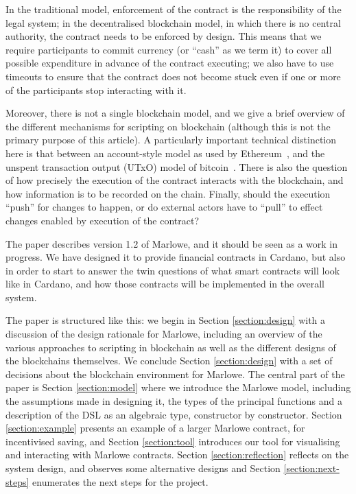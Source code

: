 \documentclass[
      acmsmall
    , screen
    , review=true
  ]{acmart}
\begin{document}
In the traditional model, enforcement of the contract is the responsibility of the legal system; in the decentralised blockchain model, in which there is no central authority, the contract needs to be enforced by design. This means that we require participants to commit currency (or ``cash'' as we term it) to cover all possible expenditure in advance of the contract executing; we also have to use timeouts to ensure that the contract does not become stuck even if one or more of the participants stop interacting with it.

Moreover, there is not a single blockchain model, and we give a brief overview of the different mechanisms for scripting on blockchain (although this is not the primary purpose of this article). 
A particularly important technical distinction here is that between an account-style model as used by Ethereum~\cite{EthereumRationale}, and the unspent transaction output (UTxO) model of bitcoin~\cite{sok}. 
There is also the question of how precisely the execution of the contract interacts with the blockchain, and how information is to be recorded on the chain. Finally, should the execution ``push'' for changes  to happen, or do external actors have to ``pull'' to effect changes enabled by execution of the contract?

The paper describes version 1.2 of Marlowe, and it should be seen as a work in progress. We have designed it to provide financial contracts in Cardano, but also in order to start to answer the twin
 questions of what smart contracts will look like in Cardano, and how those contracts will be implemented in the overall system.

The paper is structured like this: we begin in Section \ref{section:design} with a discussion of the design rationale for Marlowe, including an overview of the various approaches to scripting in blockchain as well as the different designs of the blockchains themselves. We conclude Section \ref{section:design} with a set of decisions about the blockchain environment for Marlowe. The central part of the paper is Section \ref{section:model} where we introduce the Marlowe model, including the assumptions made in designing 
it, the types of the principal functions and a description of the DSL as an algebraic type, constructor by constructor. Section \ref{section:example} presents an example of a larger Marlowe contract, for incentivised saving, and Section \ref{section:tool} introduces our tool for visualising and interacting with Marlowe contracts.
Section \ref{section:reflection} reflects on the system design, and observes some alternative designs and Section \ref{section:next-steps} enumerates the next steps for the project.
\end{document}
